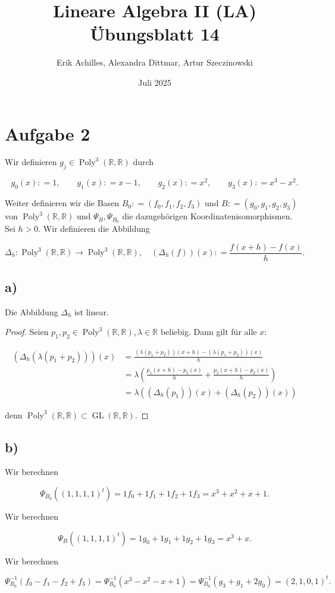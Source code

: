 \documentclass{article}
\title{Lineare Algebra II (LA) Übungsblatt 14}
\author{Erik Achilles, Alexandra Dittmar, Artur Szeczinowski}
\date{Juli 2025}
\newcommand{\RR}{\mathbb{R}}
\DeclareMathOperator{\Poly}{Poly}
\DeclareMathOperator{\GL}{GL}
\begin{document}
\section*{Aufgabe 2}

Wir definieren
$g_j \in \Poly^3(\RR, \RR)$
durch

\[
g_0(x) : = 1,
\qquad
g_1(x) : = x - 1,
\qquad
g_2(x) : = x^2,
\qquad
g_3(x) : = x^3 - x^2.
\]

Weiter definieren wir die Basen
$B_0 : = (f_0, f_1, f_2, f_3)$
und
$B : = (g_0, g_1, g_2, g_3)$
von
$\Poly^3(\RR, \RR)$
und
$\Psi_B, \Psi_{B_0}$
die dazugehörigen Koordinatenisomorphismen.
Sei
$h > 0$.
Wir definieren die Abbildung

\[
\Delta_h : \Poly^3(\RR, \RR) \to \Poly^3(\RR, \RR),
\quad
(\Delta_h(f))(x) : = \frac{f(x + h) - f(x)}{h}.
\]

\subsection*{a)}

Die Abbildung
$\Delta_h$
ist linear.

\begin{proof}
    Seien
    $p_1, p_2 \in \Poly^3(\RR,\RR), \lambda \in \RR$
    beliebig.
    Dann gilt für alle
    $ x $:
    
    \[
    \begin{aligned}
        (\Delta_h (\lambda(p_1 + p_2)))(x)
        &= 
        \frac{(\lambda(p_1 + p_2))(x + h) - (\lambda(p_1 + p_2))(x)}{h}
        \\ &=
        \lambda
        \left( \frac{p_1(x + h) - p_1(x)}{h}
        +
        \frac{p_2(x + h) - p_2(x)}{h} \right)
        \\ &= 
        \lambda
        \left( (\Delta_h (p_1))(x)
        +
        (\Delta_h (p_2))(x) \right)
    \end{aligned}
    \]
    
    denn 
    $ \Poly^3(\RR,\RR) \subset \GL(\RR,\RR) $.
\end{proof}

\subsection*{b)}

Wir berechnen

\[
\Psi_{B_0}((1,1,1,1)^t)
=
1 f_0 + 1 f_1 + 1 f_2 + 1 f_3
=
x^3 + x^2 + x + 1
.
\]

Wir berechnen

\[
\Psi_B ((1,1,1,1)^t)
=
1 g_0 + 1 g_1 + 1 g_2 + 1 g_3
=
x^3 + x
.
\]

Wir berechnen

\[
\Psi_{B_0}^{-1}(f_0 - f_1 - f_2 + f_3)
=
\Psi_{B_0}^{-1}(x^3 - x^2 - x + 1)
=
\Psi_{B_0}^{-1}(g_3 + g_1 + 2 g_0)
=
(2,1,0,1)^t
.
\]
\end{document}
